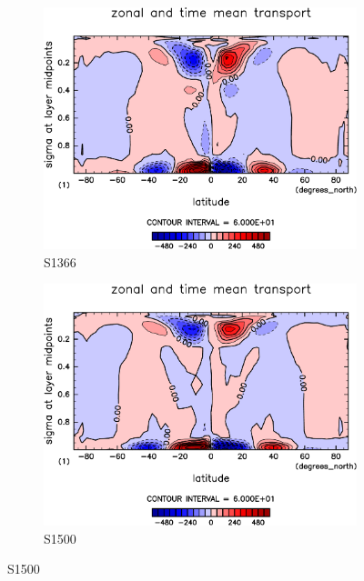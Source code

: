 \documentclass[body]{subfiles}
\begin{document}
\begin{figure}[t]
	\centering
	\begin{subfigure}{.4\textwidth}
		\centering
		\includegraphics[width=\columnwidth]{S1366/MeriHeatTransTest@dryStatEn_M,time=14600:14965-crop-rotate.pdf}
		\caption{S1366}\label{乾燥静的エネルギー平均子午面循環S1366}
	\end{subfigure}
	\begin{subfigure}{.4\textwidth}
		\centering
		\includegraphics[width=\columnwidth]{S1500/MeriHeatTransTest@dryStatEn_M,time=3650:4015-crop-rotate.pdf}
		\caption{S1500}\label{乾燥静的エネルギー平均子午面循環S1500}
	\end{subfigure}

\end{figure}
\end{document}
